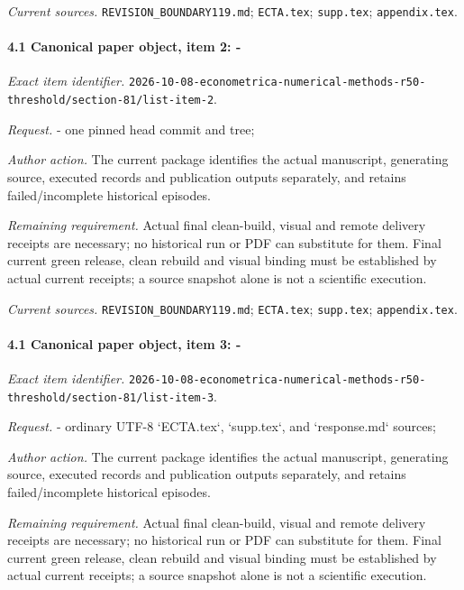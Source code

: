 \par\emph{Current sources.} \nolinkurl{REVISION_BOUNDARY119.md}; \nolinkurl{ECTA.tex}; \nolinkurl{supp.tex}; \nolinkurl{appendix.tex}.

\paragraph{4.1 Canonical paper object, item 2: -}

\emph{Exact item identifier.} \nolinkurl{2026-10-08-econometrica-numerical-methods-r50-threshold/section-81/list-item-2}.

\par\emph{Request.} - one pinned head commit and tree;

\par\emph{Author action.} The current package identifies the actual manuscript, generating source, executed records and publication outputs separately, and retains failed/\allowbreak{}incomplete historical episodes.

\par\emph{Remaining requirement.} Actual final clean-build, visual and remote delivery receipts are necessary; no historical run or PDF can substitute for them. Final current green release, clean rebuild and visual binding must be established by actual current receipts; a source snapshot alone is not a scientific execution.

\par\emph{Current sources.} \nolinkurl{REVISION_BOUNDARY119.md}; \nolinkurl{ECTA.tex}; \nolinkurl{supp.tex}; \nolinkurl{appendix.tex}.

\paragraph{4.1 Canonical paper object, item 3: -}

\emph{Exact item identifier.} \nolinkurl{2026-10-08-econometrica-numerical-methods-r50-threshold/section-81/list-item-3}.

\par\emph{Request.} - ordinary UTF-8 `ECTA.tex`, `supp.tex`, and `response.md` sources;

\par\emph{Author action.} The current package identifies the actual manuscript, generating source, executed records and publication outputs separately, and retains failed/\allowbreak{}incomplete historical episodes.

\par\emph{Remaining requirement.} Actual final clean-build, visual and remote delivery receipts are necessary; no historical run or PDF can substitute for them. Final current green release, clean rebuild and visual binding must be established by actual current receipts; a source snapshot alone is not a scientific execution.

